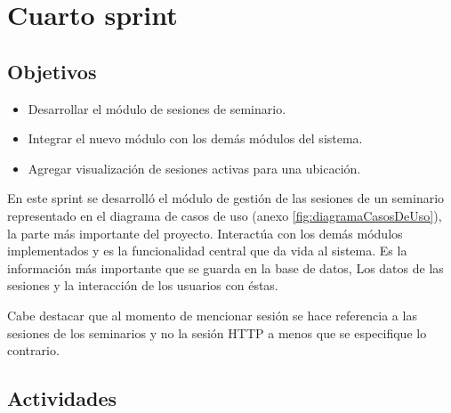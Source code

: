 \section{Cuarto sprint} %
\label{sec:cuarto_sprint}

\subsection{Objetivos}

\begin{itemize}
	\item Desarrollar el módulo de sesiones de seminario.
	\item Integrar el nuevo módulo con los demás módulos del sistema.
	\item Agregar visualización de sesiones activas para una ubicación.
\end{itemize}

En este sprint se desarrolló el módulo de gestión de las sesiones de un seminario representado en el diagrama de casos de uso (anexo \ref{fig:diagramaCasosDeUso}), la parte más importante del proyecto. Interactúa con los demás módulos implementados y es la funcionalidad central que da vida al sistema. Es la información más importante que se guarda en la base de datos, Los datos de las sesiones y la interacción de los usuarios con éstas.

Cabe destacar que al momento de mencionar sesión se hace referencia a las sesiones de los seminarios y no la sesión \gls{HTTP} a menos que se especifique lo contrario.

\subsection{Actividades} %
\label{sub:actividades4}


